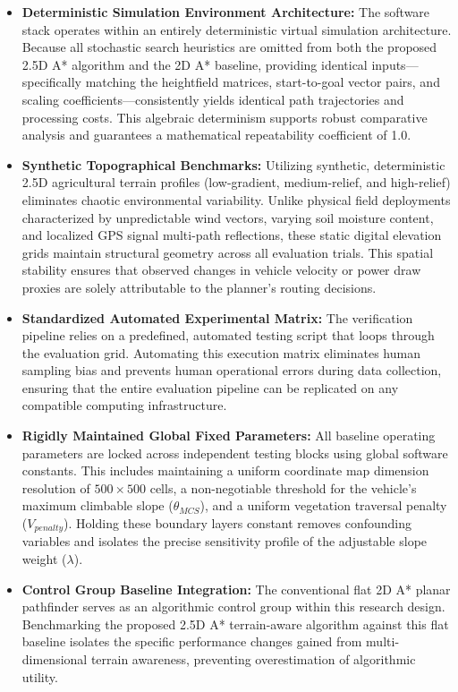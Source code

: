 \begin{itemize}
    \item \textbf{Deterministic Simulation Environment Architecture:} The software stack operates within an entirely deterministic virtual simulation architecture. Because all stochastic search heuristics are omitted from both the proposed 2.5D A* algorithm and the 2D A* baseline, providing identical inputs---specifically matching the heightfield matrices, start-to-goal vector pairs, and scaling coefficients---consistently yields identical path trajectories and processing costs. This algebraic determinism supports robust comparative analysis and guarantees a mathematical repeatability coefficient of 1.0.

    \item \textbf{Synthetic Topographical Benchmarks:} Utilizing synthetic, deterministic 2.5D agricultural terrain profiles (low-gradient, medium-relief, and high-relief) eliminates chaotic environmental variability. Unlike physical field deployments characterized by unpredictable wind vectors, varying soil moisture content, and localized GPS signal multi-path reflections, these static digital elevation grids maintain structural geometry across all evaluation trials. This spatial stability ensures that observed changes in vehicle velocity or power draw proxies are solely attributable to the planner's routing decisions.

    \item \textbf{Standardized Automated Experimental Matrix:} The verification pipeline relies on a predefined, automated testing script that loops through the evaluation grid. Automating this execution matrix eliminates human sampling bias and prevents human operational errors during data collection, ensuring that the entire evaluation pipeline can be replicated on any compatible computing infrastructure.

    \item \textbf{Rigidly Maintained Global Fixed Parameters:} All baseline operating parameters are locked across independent testing blocks using global software constants. This includes maintaining a uniform coordinate map dimension resolution of $500 \times 500$ cells, a non-negotiable threshold for the vehicle's maximum climbable slope ($\theta_{MCS}$), and a uniform vegetation traversal penalty ($V_{penalty}$). Holding these boundary layers constant removes confounding variables and isolates the precise sensitivity profile of the adjustable slope weight ($\lambda$).

    \item \textbf{Control Group Baseline Integration:} The conventional flat 2D A* planar pathfinder serves as an algorithmic control group within this research design. Benchmarking the proposed 2.5D A* terrain-aware algorithm against this flat baseline isolates the specific performance changes gained from multi-dimensional terrain awareness, preventing overestimation of algorithmic utility.
\end{itemize}

